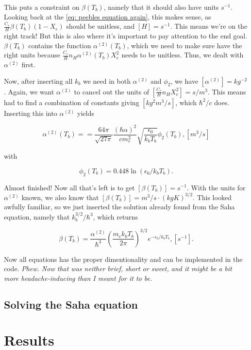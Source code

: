 \documentclass[12pt]{article}
\begin{document}
This puts a constraint on $\beta(T_b)$, namely that it should also have units $s^{-1}$. Looking back at the \cref{eq: peebles equation again}, this makes sense, as $\frac{C_r}{H}\beta(T_b)(1-X_e)$ should be unitless, and $[H] = s^{-1}$. This means we're on the right track! But this is also where it's important to pay attention to the end goal. $\beta(T_b)$ contains the function $\alpha^{(2)}(T_b)$, which we need to make sure have the right units because $\frac{C_r}{H}n_H\alpha^{(2)}(T_b)X_e^2$ needs to be unitless. Thus, we dealt with $\alpha^{(2)}$ first. 

Now, after inserting all $k_b$ we need in both $\alpha^{(2)}$ and $\phi_2$, we have $[\alpha^{(2)}] = kg^{-2}$. Again, we want $\alpha^{(2)}$ to cancel out the units of $[\frac{C_r}{H}n_HX_e^2] = s/m^3$. This means had to find a combination of constants giving $[kg^2m^3/s]$, which $\hbar^2/c$ does. Inserting this into $\alpha^{(2)}$ yields

\begin{equation*}
    \alpha^{(2)}(T_b) = =\frac{64 \pi}{\sqrt{27 \pi}} \frac{(\hbar\alpha)^{2}}{cm_{e}^{2}} \sqrt{\frac{\epsilon_{0}}{k_bT_{b}}} \phi_{2}\left(T_{b}\right), [m^3/s]
\end{equation*}

with

\begin{equation*}
    \phi_2(T_b) = 0.448\ln(\epsilon_0/k_b T_b).
\end{equation*}

Almost finished! Now all that's left is to get $[\beta(T_b)] = s^{-1}$. With the units for $\alpha^{(2)}$ known, we also know that $[\beta(T_b)] = m^3/s\cdot\left(kgK\right)^{3/2}$. This looked awfully familiar, so we just inserted the solution already found from the Saha equation, namely that $k_b^{3/2}/\hbar^3$, which returns

\begin{equation*}
    \beta(T_b) = \frac{\alpha^{(2)}}{\hbar^3} \left(\frac{m_e k_b T_b}{2\pi}\right)^{3/2} e^{-\epsilon_0/k_b T_b}, [s^{-1}].
\end{equation*}

Now all equations has the proper dimentionality and can be implemented in the code. \textit{Phew. Now that was neither brief, short or sweet, and it might be a bit more headache-inducing than I meant for it to be.}

\subsection{Solving the Saha equation}
\section{Results}

{}

\end{document}
